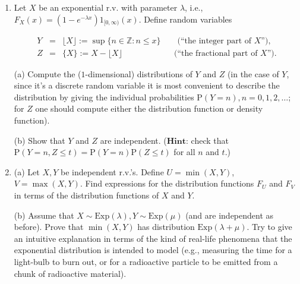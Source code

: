 \documentclass[11pt]{report}
\theoremstyle{plain}
\theoremstyle{definition}
\begin{document}
\begin{enumerate}[label=\arabic*.]
\[
\mathrm{P}(B_n(a_1,\ldots,a_n)) = \frac{1}{2^n}.
\]

\noindent (c) Define a function
$f:(0,1) \to \{0,1\}^{\mathbb{N}}$ by

\[
f(x) = (R_1(x), R_2(x), R_3(x), \ldots).
\]

\noindent Prove that $f$ is a measurable function when the
space $\{0,1\}^{\mathbb{N}}$ is equipped with the
$\sigma$-algebra generated by the sets

\[
A_n(1) = \{ (x_1,x_2,\ldots) \in \{0,1\}^{\mathbb{N}} : x_n = 1 \}.
\]

\noindent (d) Prove that the push-forward of Lebesgue measure
under $f$ is the probability measure corresponding to
the random experiment of an infinite sequence of fair
coin tosses.

\item Let $X$ be an exponential r.v. with parameter
$\lambda$, i.e.,
$F_X(x)=(1-e^{-\lambda x}) 1_{[0,\infty)}(x)$. Define
random variables

\begin{eqnarray*}
Y &=& \lfloor X \rfloor := \sup \{ n\in \mathbb{Z} : n \le x \} \qquad\textrm{(``the integer part of $X$'')}, \\
Z &=& \{ X \} := X-\lfloor X \rfloor \qquad \qquad\ \qquad\textrm{(``the fractional part of $X$'')}.
\end{eqnarray*}

\noindent (a) Compute the ($1$-dimensional) distributions of $Y$
and $Z$ (in the case of $Y$, since it's a discrete
random variable it is most convenient to describe the
distribution by giving the individual probabilities
$\mathrm{P}(Y=n), n=0,1,2,\ldots$; for $Z$ one should
compute either the distribution function or density
function).

(b) Show that $Y$ and $Z$ are independent.
($\textbf{Hint:}$ check that
$\mathrm{P}(Y=n, Z\le
t)=\mathrm{P}(Y=n)\mathrm{P}(Z\le t)$
for all $n$ and $t$.)

\item (a) Let $X, Y$ be independent r.v.'s. Define
$U=\min(X,Y)$, $V=\max(X,Y)$. Find expressions for
the distribution functions $F_U$ and $F_V$ in terms
of the distribution functions of $X$ and $Y$.

(b) Assume that
$X \sim \textrm{Exp}(\lambda), Y \sim
\textrm{Exp}(\mu)$
(and are independent as before). Prove that
$\min(X,Y)$ has distribution
$\textrm{Exp}(\lambda+\mu)$. Try to give an intuitive
explanation in terms of the kind of real-life
phenomena that the exponential distribution is
intended to model (e.g., measuring the time for a
light-bulb to burn out, or for a radioactive particle
to be emitted from a chunk of radioactive material).


\end{enumerate}
\end{document}
